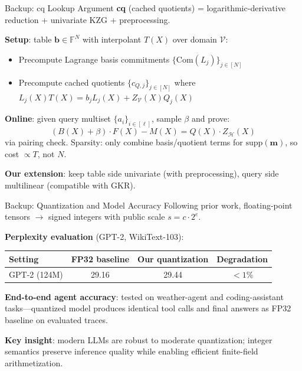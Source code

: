 \documentclass[aspectratio=169,10pt]{beamer}
\newcommand{\F}{\mathbb{F}}
\begin{document}
\begin{frame}{Backup: cq Lookup Argument}
\textbf{cq} (cached quotients) = logarithmic-derivative reduction + univariate KZG + preprocessing.

\vspace{4pt}
\textbf{Setup}: table $\mathbf{b} \in \F^N$ with interpolant $T(X)$ over domain $\mathcal{V}$:
\begin{itemize}
  \item Precompute Lagrange basis commitments $\{\mathrm{Com}(L_j)\}_{j \in [N]}$
  \item Precompute cached quotients $\{c_{Q,j}\}_{j \in [N]}$ where $L_j(X)T(X) = b_j L_j(X) + Z_\mathcal{V}(X)Q_j(X)$
\end{itemize}

\vspace{4pt}
\textbf{Online}: given query multiset $\{a_i\}_{i \in [\ell]}$, sample $\beta$ and prove:
\[
  (B(X) + \beta) \cdot F(X) - M(X) = Q(X) \cdot Z_\mathcal{H}(X)
\]
via pairing check. Sparsity: only combine basis/quotient terms for $\mathrm{supp}(\mathbf{m})$, so cost $\propto T$, not $N$.

\vspace{4pt}
\textbf{Our extension}: keep table side univariate (with preprocessing), query side multilinear (compatible with GKR).
\end{frame}

\begin{frame}{Backup: Quantization and Model Accuracy}
Following prior work, floating-point tensors $\to$ signed integers with public scale $s = c \cdot 2^e$.

\vspace{4pt}
\textbf{Perplexity evaluation} (GPT-2, WikiText-103):

\vspace{2pt}
\begin{center}
\begin{tabular}{@{}lccc@{}}
\toprule
Setting & FP32 baseline & Our quantization & Degradation \\
\midrule
GPT-2 (124M) & 29.16 & 29.44 & $< 1\%$ \\
\bottomrule
\end{tabular}
\end{center}

\vspace{4pt}
\textbf{End-to-end agent accuracy}: tested on weather-agent and coding-assistant tasks---quantized model produces identical tool calls and final answers as FP32 baseline on evaluated traces.

\vspace{4pt}
\textbf{Key insight}: modern LLMs are robust to moderate quantization; integer semantics preserve inference quality while enabling efficient finite-field arithmetization.
\end{frame}
\end{document}
